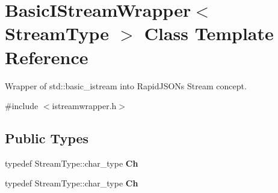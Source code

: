 \hypertarget{class_basic_i_stream_wrapper}{}\section{Basic\+I\+Stream\+Wrapper$<$ Stream\+Type $>$ Class Template Reference}
\label{class_basic_i_stream_wrapper}


Wrapper of {\ttfamily std\+::basic\+\_\+istream} into Rapid\+J\+S\+ON\textquotesingle{}s Stream concept.  




{\ttfamily \#include $<$istreamwrapper.\+h$>$}

\subsection*{Public Types}
\begin{DoxyCompactItemize}
\item 
typedef Stream\+Type\+::char\+\_\+type {\bfseries Ch}\hypertarget{class_basic_i_stream_wrapper_a88e4288ecdaa0d31ddf4e5917b9aa8d7}{}\label{class_basic_i_stream_wrapper_a88e4288ecdaa0d31ddf4e5917b9aa8d7}

\item 
typedef Stream\+Type\+::char\+\_\+type {\bfseries Ch}\hypertarget{class_basic_i_stream_wrapper_a88e4288ecdaa0d31ddf4e5917b9aa8d7}{}\label{class_basic_i_stream_wrapper_a88e4288ecdaa0d31ddf4e5917b9aa8d7}

\end{DoxyCompactItemize}
